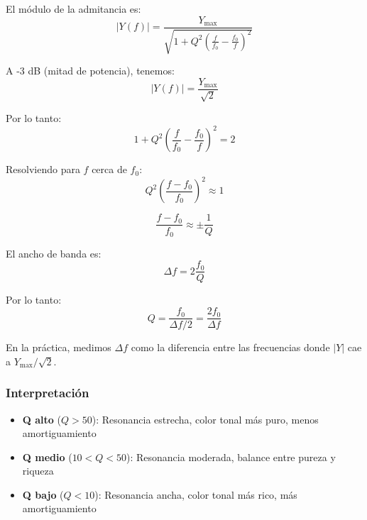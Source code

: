 \documentclass[12pt,a4paper,twocolumn]{article}
\newcommand{\admittance}{Y}
\newcommand{\freqzero}{f_0}
\begin{document}
El módulo de la admitancia es:
\begin{equation}
|\admittance(f)| = \frac{\admittance_{\max}}{\sqrt{1 + Q^2 \left(\frac{f}{\freqzero} - \frac{\freqzero}{f}\right)^2}}
\label{eq:admittance_modulo}
\end{equation}

A -3 dB (mitad de potencia), tenemos:
\begin{equation}
|\admittance(f)| = \frac{\admittance_{\max}}{\sqrt{2}}
\label{eq:admittance_3db}
\end{equation}

Por lo tanto:
\begin{equation}
1 + Q^2 \left(\frac{f}{\freqzero} - \frac{\freqzero}{f}\right)^2 = 2
\label{eq:q_ecuacion}
\end{equation}

Resolviendo para $f$ cerca de $\freqzero$:
\begin{equation}
Q^2 \left(\frac{f - \freqzero}{\freqzero}\right)^2 \approx 1
\label{eq:q_aproximacion}
\end{equation}

\begin{equation}
\frac{f - \freqzero}{\freqzero} \approx \pm \frac{1}{Q}
\label{eq:q_relacion}
\end{equation}

El ancho de banda es:
\begin{equation}
\Delta f = 2 \frac{\freqzero}{Q}
\label{eq:ancho_banda}
\end{equation}

Por lo tanto:
\begin{equation}
Q = \frac{\freqzero}{\Delta f/2} = \frac{2\freqzero}{\Delta f}
\label{eq:q_final}
\end{equation}

En la práctica, medimos $\Delta f$ como la diferencia entre las frecuencias donde $|\admittance|$ cae a $\admittance_{\max}/\sqrt{2}$.

\subsubsection{Interpretación}

\begin{itemize}
    \item \textbf{Q alto} ($Q > 50$): Resonancia estrecha, color tonal más puro, menos amortiguamiento
    \item \textbf{Q medio} ($10 < Q < 50$): Resonancia moderada, balance entre pureza y riqueza
    \item \textbf{Q bajo} ($Q < 10$): Resonancia ancha, color tonal más rico, más amortiguamiento
\end{itemize}
\end{document}
